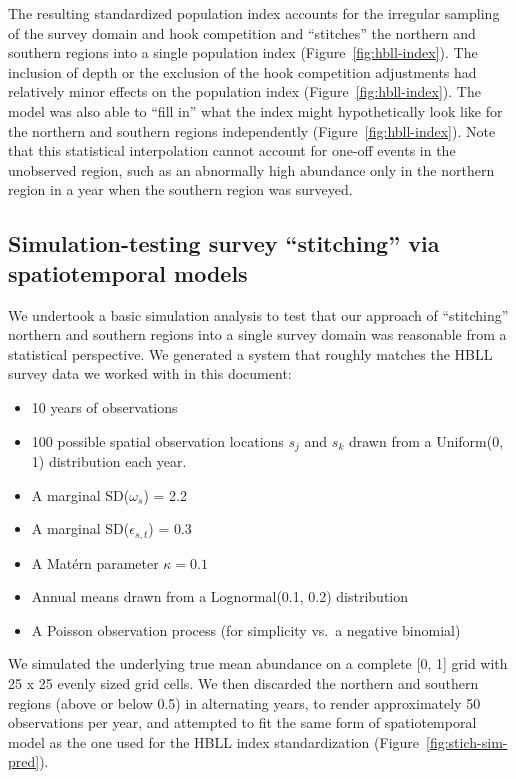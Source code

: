 \documentclass[11pt]{book}
\begin{document}
The resulting standardized population index accounts for the irregular sampling of the survey domain and hook competition and ``stitches'' the northern and southern regions into a single population index (Figure~\ref{fig:hbll-index}). The inclusion of depth or the exclusion of the hook competition adjustments had relatively minor effects on the population index (Figure~\ref{fig:hbll-index}). The model was also able to ``fill in'' what the index might hypothetically look like for the northern and southern regions independently (Figure~\ref{fig:hbll-index}). Note that this statistical interpolation cannot account for one-off events in the unobserved region, such as an abnormally high abundance only in the northern region in a year when the southern region was surveyed.

\hypertarget{sec:hbll-sim}{%
\subsection{Simulation-testing survey ``stitching'' via spatiotemporal models}\label{sec:hbll-sim}}

We undertook a basic simulation analysis to test that our approach of ``stitching'' northern and southern regions into a single survey domain was reasonable from a statistical perspective. We generated a system that roughly matches the HBLL survey data we worked with in this document:
\begin{itemize}

\item
  10 years of observations
\item
  100 possible spatial observation locations \(s_j\) and \(s_k\) drawn from a Uniform(0, 1) distribution each year.
\item
  A marginal SD(\(\omega_s\)) = 2.2
\item
  A marginal SD(\(\epsilon_{s,t}\)) = 0.3
\item
  A \mbox{Mat\'ern} parameter \(\kappa = 0.1\)
\item
  Annual means drawn from a Lognormal(0.1, 0.2) distribution
\item
  A Poisson observation process (for simplicity vs.~a negative binomial)
\end{itemize}
We simulated the underlying true mean abundance on a complete {[}0, 1{]} grid with 25 x 25 evenly sized grid cells. We then discarded the northern and southern regions (above or below 0.5) in alternating years, to render approximately 50 observations per year, and attempted to fit the same form of spatiotemporal model as the one used for the HBLL index standardization (Figure~\ref{fig:stich-sim-pred}).
\end{document}
